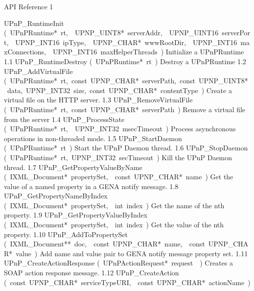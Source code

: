 \documentclass{article}
\begin{document}
\begin{cxxentry}
{}
        {API Reference }
        {}
        {}
        {1}
\begin{cxxnames}
        {UPnP\_RuntimeInit}
        {(\ UPnPRuntime*\ rt,\ \ UPNP\_UINT8*\ serverAddr,\ \ UPNP\_UINT16\ serverPort,\ \ UPNP\_INT16\ ipType,\ \ UPNP\_CHAR*\ wwwRootDir,\ \ UPNP\_INT16\ maxConnections,\ \ UPNP\_INT16\ maxHelperThreads\ )}
        {Initialize a UPnPRuntime }
        {1.1}
        {UPnP\_RuntimeDestroy}
        {(\ UPnPRuntime*\ rt\ )}
        {Destroy a UPnPRuntime }
        {1.2}
        {UPnP\_AddVirtualFile}
        {(\ UPnPRuntime*\ rt,\ const\ UPNP\_CHAR*\ serverPath,\ const\ UPNP\_UINT8*\ data,\ UPNP\_INT32\ size,\ const\ UPNP\_CHAR*\ contentType\ )}
        {Create a virtual file on the HTTP server. }
        {1.3}
        {UPnP\_RemoveVirtualFile}
        {(\ UPnPRuntime*\ rt,\ const\ UPNP\_CHAR*\ serverPath\ )}
        {Remove a virtual file from the server }
        {1.4}
        {UPnP\_ProcessState}
        {(\ UPnPRuntime*\ rt,\ \ UPNP\_INT32\ msecTimeout\ )}
        {Process asynchronous operations in non-threaded mode. }
        {1.5}
        {UPnP\_StartDaemon}
        {(\ UPnPRuntime*\ rt\ )}
        {Start the UPnP Daemon thread. }
        {1.6}
        {UPnP\_StopDaemon}
        {(\ UPnPRuntime*\ rt,\ UPNP\_INT32\ secTimeout\ )}
        {Kill the UPnP Daemon thread. }
        {1.7}
        {UPnP\_GetPropertyValueByName}
        {(\ IXML\_Document*\ propertySet,\ \ const\ UPNP\_CHAR*\ name\ )}
        {Get the value of a named property in a GENA notify message. }
        {1.8}
        {UPnP\_GetPropertyNameByIndex}
        {(\ IXML\_Document*\ propertySet,\ \ int\ index\ )}
        {Get the name of the nth property. }
        {1.9}
        {UPnP\_GetPropertyValueByIndex}
        {(\ IXML\_Document*\ propertySet,\ \ int\ index\ )}
        {Get the value of the nth property. }
        {1.10}
        {UPnP\_AddToPropertySet}
        {(\ IXML\_Document**\ doc,\ \ const\ UPNP\_CHAR*\ name,\ \ const\ UPNP\_CHAR*\ value\ )}
        {Add name and value pair to GENA notify message property set. }
        {1.11}
        {UPnP\_CreateActionResponse}
        {(\ UPnPActionRequest*\ request\ \ )}
        {Creates a SOAP action response message. }
        {1.12}
        {UPnP\_CreateAction}
        {(\ const\ UPNP\_CHAR*\ serviceTypeURI,\ \ const\ UPNP\_CHAR*\ actionName\ )}

\end{cxxnames}
\end{cxxentry}
\end{document}
